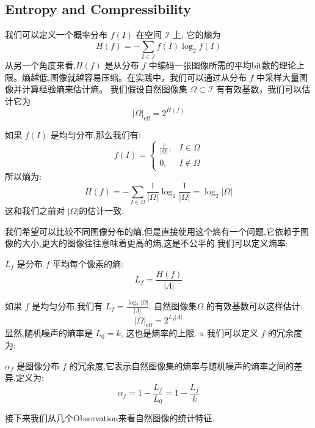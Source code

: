 \subsection{Entropy and Compressibility}
我们可以定义一个概率分布 $f(I)$ 在空间 $\mathcal{I}$ 上. 它的熵为
\begin{equation}
    H(f) = -\sum_{I \in \mathcal{I}} f(I) \log_2 f(I)
\end{equation}
从另一个角度来看,$H(f)$ 是从分布 $f$ 中编码一张图像所需的平均bit数的理论上限。熵越低,图像就越容易压缩。在实践中，我们可以通过从分布 $f$ 中采样大量图像并计算经验熵来估计熵。
我们假设自然图像集 $\Omega \subset \mathcal{I}$ 有有效基数，我们可以估计它为
\begin{equation}
    |\Omega|_{\text{eff}} = 2^{H(f)}
\end{equation}
\begin{notes}[均匀分布的熵]
    如果 $f(I)$ 是均匀分布,那么我们有:
    \begin{equation}
        f(I) = \begin{cases}
            \frac{1}{|\Omega|}, & I \in \Omega \\
            0, & I \notin \Omega
        \end{cases}
    \end{equation}
    所以熵为:
    \begin{equation}
        H(f) = -\sum_{I \in \Omega} \frac{1}{|\Omega|} \log_2 \frac{1}{|\Omega|} = \log_2 |\Omega|
    \end{equation}
    这和我们之前对 $|\Omega|$的估计一致.
\end{notes}
我们希望可以比较不同图像分布的熵,但是直接使用这个熵有一个问题,它依赖于图像的大小,更大的图像往往意味着更高的熵,这是不公平的.我们可以定义熵率:
\begin{definition}
    $L_f$ 是分布 $f$ 平均每个像素的熵:
    \begin{equation}
        L_f = \frac{H(f)}{|\Lambda|}
    \end{equation}
\end{definition}
如果 $f$ 是均匀分布,我们有 $L_f = \frac{\log_2 |\Omega|}{|\Lambda|}$. 自然图像集$\Omega$ 的有效基数可以这样估计:
\begin{equation}
    |\Omega|_{\text{eff}} = 2^{L_f |\Lambda|}
\end{equation}
显然,随机噪声的熵率是 $L_0 = k$, 这也是熵率的上限. x
我们可以定义 $f$ 的冗余度为:
\begin{definition}[冗余度]
    $\alpha_f$ 是图像分布 $f$ 的冗余度,它表示自然图像集的熵率与随机噪声的熵率之间的差异.定义为:
    \begin{equation}
        \alpha_f = 1 - \frac{L_f}{L_0} = 1 - \frac{L_f}{k}
    \end{equation}
\end{definition}
接下来我们从几个Observation来看自然图像的统计特征.
